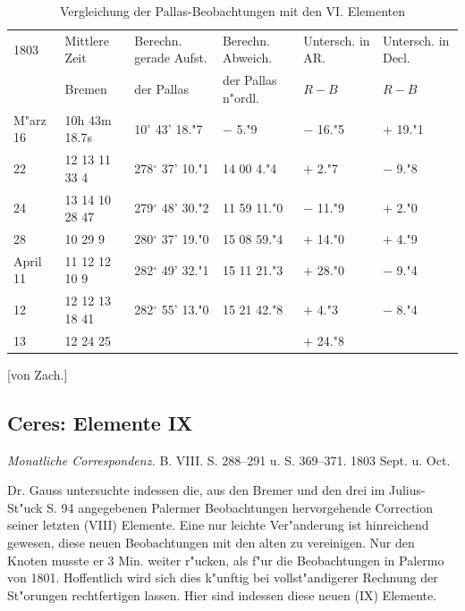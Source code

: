 \documentclass[12pt,a4paper]{article}
\begin{document}
\begin{table}[H]
\centering
\begin{tabular}{l l l l l l}
\toprule
1803 & Mittlere Zeit & Berechn. gerade Aufst. & Berechn. Abweich. & Untersch. in AR. & Untersch. in Decl. \\
& Bremen & der Pallas & der Pallas n"ordl. & $R-B$ & $R-B$ \\
\midrule
M"arz 16 & 10h 43m 18.7s & 10$^\circ$ 43' 18."7 & $-$ 5."9 & $-$ 16."5 & $+$ 19."1 \\
22 & 12 13 11 33 4 & 278$^\circ$ 37' 10."1 & 14 00 4."4 & $+$ 2."7 & $-$ 9."8 \\
24 & 13 14 10 28 47 & 279$^\circ$ 48' 30."2 & 11 59 11."0 & $-$ 11."9 & $+$ 2."0 \\
28 & 10 29 9 & 280$^\circ$ 37' 19."0 & 15 08 59."4 & $+$ 14."0 & $+$ 4."9 \\
April 11 & 11 12 12 10 9 & 282$^\circ$ 49' 32."1 & 15 11 21."3 & $+$ 28."0 & $-$ 9."4 \\
12 & 12 12 13 18 41 & 282$^\circ$ 55' 13."0 & 15 21 42."8 & $+$ 4."3 & $-$ 8."4 \\
13 & 12 24 25 & & & $+$ 24."8 & \\
\bottomrule
\end{tabular}
\caption{Vergleichung der Pallas-Beobachtungen mit den VI. Elementen}
\end{table}

[von Zach.]

\subsection{Ceres: Elemente IX}

\textit{Monatliche Correspondenz.} B. VIII. S. 288--291 u. S. 369--371. 1803 Sept. u. Oct.

Dr. Gauss untersuchte indessen die, aus den Bremer und den drei im Julius-St"uck S. 94 angegebenen Palermer Beobachtungen hervorgehende Correction seiner letzten (VIII) Elemente. Eine nur leichte Ver"anderung ist hinreichend gewesen, diese neuen Beobachtungen mit den alten zu vereinigen. Nur den Knoten musste er 3 Min. weiter r"ucken, als f"ur die Beobachtungen in Palermo von 1801. Hoffentlich wird sich dies k"unftig bei vollst"andigerer Rechnung der St"orungen rechtfertigen lassen. Hier sind indessen diese neuen (IX) Elemente.
\end{document}
